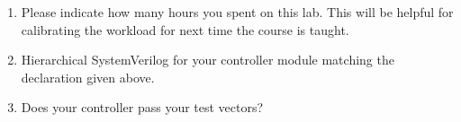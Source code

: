 \documentclass{../../e85}
\date{2019 April 22 (Monday)}
\author{}
\begin{document}
\begin{enumerate}
\item Please indicate how many hours you spent on this lab.  This will
  be helpful for calibrating the workload for next time the course is
  taught.

  \begin{solution}

  \end{solution}

\item Hierarchical SystemVerilog for your controller module matching
  the declaration given above.

  \begin{solution}

  \end{solution}

\item Does your controller pass your test vectors?

  \begin{solution}

  \end{solution}
\end{enumerate}
\end{document}
